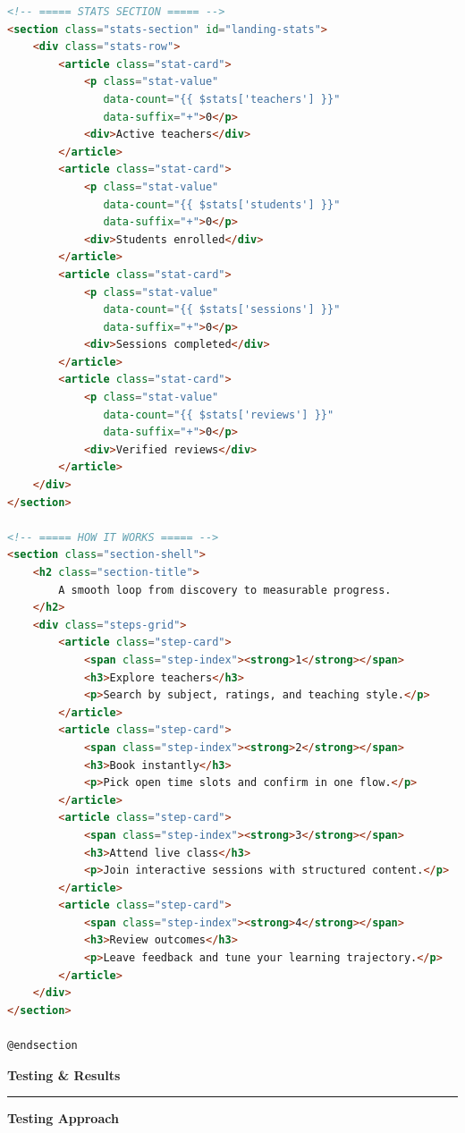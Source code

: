 \documentclass[12pt,a4paper]{report}
\begin{document}
\begin{lstlisting}[language=html, caption={landing.blade.php -- Hero \& Stats Section}]
<!-- ===== STATS SECTION ===== -->
<section class="stats-section" id="landing-stats">
    <div class="stats-row">
        <article class="stat-card">
            <p class="stat-value"
               data-count="{{ $stats['teachers'] }}"
               data-suffix="+">0</p>
            <div>Active teachers</div>
        </article>
        <article class="stat-card">
            <p class="stat-value"
               data-count="{{ $stats['students'] }}"
               data-suffix="+">0</p>
            <div>Students enrolled</div>
        </article>
        <article class="stat-card">
            <p class="stat-value"
               data-count="{{ $stats['sessions'] }}"
               data-suffix="+">0</p>
            <div>Sessions completed</div>
        </article>
        <article class="stat-card">
            <p class="stat-value"
               data-count="{{ $stats['reviews'] }}"
               data-suffix="+">0</p>
            <div>Verified reviews</div>
        </article>
    </div>
</section>

<!-- ===== HOW IT WORKS ===== -->
<section class="section-shell">
    <h2 class="section-title">
        A smooth loop from discovery to measurable progress.
    </h2>
    <div class="steps-grid">
        <article class="step-card">
            <span class="step-index"><strong>1</strong></span>
            <h3>Explore teachers</h3>
            <p>Search by subject, ratings, and teaching style.</p>
        </article>
        <article class="step-card">
            <span class="step-index"><strong>2</strong></span>
            <h3>Book instantly</h3>
            <p>Pick open time slots and confirm in one flow.</p>
        </article>
        <article class="step-card">
            <span class="step-index"><strong>3</strong></span>
            <h3>Attend live class</h3>
            <p>Join interactive sessions with structured content.</p>
        </article>
        <article class="step-card">
            <span class="step-index"><strong>4</strong></span>
            <h3>Review outcomes</h3>
            <p>Leave feedback and tune your learning trajectory.</p>
        </article>
    </div>
</section>

@endsection
\end{lstlisting}

\newpage
\thispagestyle{plain}
{\large\bfseries Testing \& Results}\\[0.6pt]
\rule{\textwidth}{0.6pt}

\vspace{0.4cm}
\textbf{Testing Approach}
\end{document}
